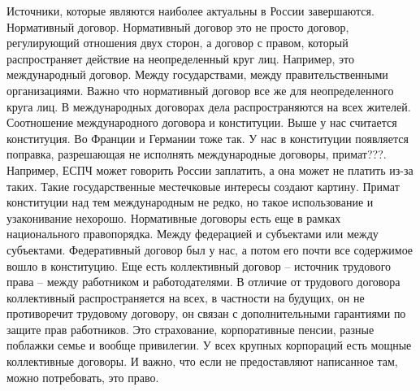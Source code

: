 \documentclass[a4paper, 12pt]{article}
\begin{document}
Источники, которые являются наиболее актуальны в России завершаются. Нормативный договор. Нормативный договор это не просто договор, регулирующий отношения двух сторон, а договор с правом, который распространяет действие на неопределенный круг лиц. Например, это международный договор. Между государствами, между правительственными организациями. Важно что нормативный договор все же для неопределенного круга лиц. В международных договорах дела распространяются на всех жителей. Соотношение международного договора и конституции. Выше у нас считается конституция. Во Франции и Германии тоже так. У нас в конституции появляется поправка, разрешающая не исполнять международные договоры, примат???. Например, ЕСПЧ может говорить России заплатить, а она может не платить из-за таких. Такие государственные местечковые интересы создают картину. Примат конституции над тем международным не редко, но такое использование и узаконивание нехорошо. Нормативные договоры есть еще в рамках национального правопорядка. Между федерацией и субъектами или между субъектами. Федеративный договор был у нас, а потом его почти все содержимое вошло в конституцию. Еще есть коллективный договор -- источник трудового права -- между работником и работодателями. В отличие от трудового договора коллективный распространяется на всех, в частности на будущих, он не противоречит трудовому договору, он связан с дополнительными гарантиями по защите прав работников. Это страхование, корпоративные пенсии, разные поблажки семье и вообще привилегии. У всех крупных корпораций есть мощные коллективные договоры. И важно, что если не предоставляют написанное там, можно потребовать, это право. 
\end{document}
